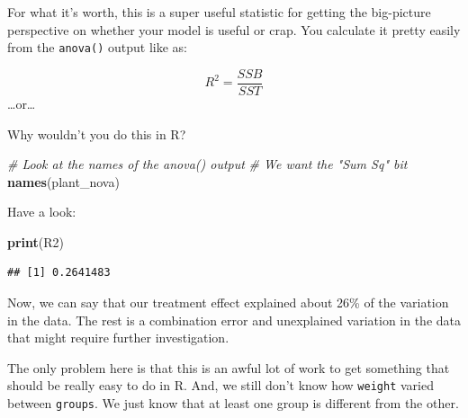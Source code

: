 \documentclass[
]{book}
\newenvironment{Shaded}{\begin{snugshade}}{\end{snugshade}}
\newcommand{\CommentTok}[1]{\textcolor[rgb]{0.56,0.35,0.01}{\textit{#1}}}
\newcommand{\DataTypeTok}[1]{\textcolor[rgb]{0.13,0.29,0.53}{#1}}
\newcommand{\DecValTok}[1]{\textcolor[rgb]{0.00,0.00,0.81}{#1}}
\newcommand{\KeywordTok}[1]{\textcolor[rgb]{0.13,0.29,0.53}{\textbf{#1}}}
\newcommand{\NormalTok}[1]{#1}
\newcommand{\OperatorTok}[1]{\textcolor[rgb]{0.81,0.36,0.00}{\textbf{#1}}}
\newcommand{\StringTok}[1]{\textcolor[rgb]{0.31,0.60,0.02}{#1}}
\begin{document}
For what it's worth, this is a super useful statistic for getting the big-picture perspective on whether your model is useful or crap. You calculate it pretty easily from the \texttt{anova()} output like as:

\[R^2 = \frac{SSB}{SST}\]
\ldots or\ldots{}

Why wouldn't you do this in R?

\begin{Shaded}
\begin{Highlighting}[]
\CommentTok{# Look at the names of the anova() output}
\CommentTok{# We want the "Sum Sq" bit}
\KeywordTok{names}\NormalTok{(plant_nova)}
\end{Highlighting}
\end{Shaded}

\begin{Shaded}
\end{Shaded}

Have a look:

\begin{Shaded}
\begin{Highlighting}[]
\KeywordTok{print}\NormalTok{(R2)}
\end{Highlighting}
\end{Shaded}

\begin{verbatim}
## [1] 0.2641483
\end{verbatim}

Now, we can say that our treatment effect explained about 26\% of the variation in the data. The rest is a combination error and unexplained variation in the data that might require further investigation.

The only problem here is that this is an awful lot of work to get something that should be really easy to do in R. And, we still don't know how \texttt{weight} varied between \texttt{groups}. We just know that at least one group is different from the other.
\end{document}

